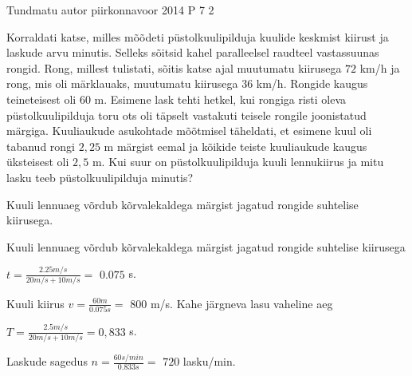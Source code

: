 {Tundmatu autor} %
{piirkonnavoor} %
{2014} %
{P 7} %
{2} %
{
\ifStatement
Korraldati katse, milles mõõdeti püstolkuulipilduja kuulide keskmist kiirust ja laskude arvu minutis. Selleks sõitsid kahel paralleelsel raudteel vastassuunas rongid. Rong, millest tulistati, sõitis katse ajal muutumatu kiirusega $72$ km/h ja rong, mis oli märklauaks, muutumatu kiirusega $36$ km/h. Rongide kaugus teineteisest oli $60$ m. Esimene lask tehti hetkel, kui rongiga risti oleva püstolkuulipilduja toru ots oli täpselt vastakuti teisele rongile joonistatud märgiga. Kuuliaukude asukohtade mõõtmisel täheldati, et esimene kuul oli tabanud rongi $2,25$ m märgist eemal ja kõikide teiste kuuliaukude kaugus üksteisest oli $2,5$ m. Kui suur on püstolkuulipilduja kuuli lennukiirus ja mitu lasku teeb püstolkuulipilduja minutis?
\fi


\ifHint
Kuuli lennuaeg võrdub kõrvalekaldega märgist jagatud rongide suhtelise kiirusega.
\fi

\ifSolution
Kuuli lennuaeg võrdub kõrvalekaldega märgist jagatud rongide suhtelise kiirusega
\begin{center}
$t = \frac{2.25 m/s}{20m/s + 10 m/s} =$ $0.075$ s.
\end{center}
Kuuli kiirus $v = \frac{60m}{0.075s} =$ $800$ m/s.
Kahe järgneva lasu vaheline aeg
\begin{center}
$T = \frac{2.5m/s}{20m/s + 10m/s} = 0,833$ s.
\end{center}
Laskude sagedus $n = \frac{60 s/min}{0.833s} =$ $720$ lasku/min.
\fi
}